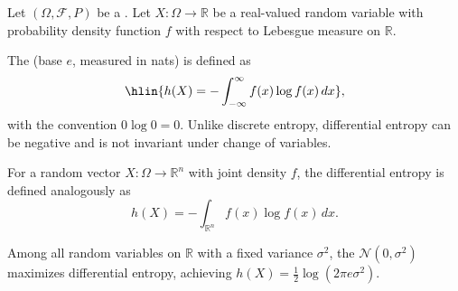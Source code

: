 \begin{definition} \label{definition:differential_entropy_of_a_continuous_random_variable}
Let $(\Omega, \mathcal{F}, P)$ be a . Let $X: \Omega \to \mathbb{R}$ be a real-valued random variable with probability density function $f$ with respect to Lebesgue measure on $\mathbb{R}$.

The  (base $e$, measured in nats) is defined as
$$\hlin{h(X) = -\int_{-\infty}^\infty f(x) \log f(x) \, dx},$$
with the convention $0 \log 0 = 0$. Unlike discrete entropy, differential entropy can be negative and is not invariant under change of variables.

For a random vector $X: \Omega \to \mathbb{R}^n$ with joint density $f$, the differential entropy is defined analogously as
$$h(X) = -\int_{\mathbb{R}^n} f(x) \log f(x) \, dx.$$

Among all random variables on $\mathbb{R}$ with a fixed variance $\sigma^2$, the  $\mathcal{N}(0, \sigma^2)$ maximizes differential entropy, achieving $h(X) = \tfrac{1}{2}\log(2\pi e \sigma^2)$.
\end{definition}
